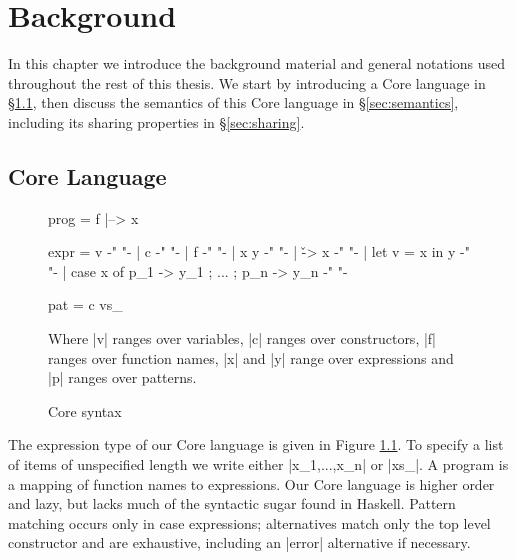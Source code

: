 

\chapter{Background}
\label{chp:background}

In this chapter we introduce the background material and general notations used throughout the rest of this thesis. We start by introducing a Core language in \S\ref{sec:core}, then discuss the semantics of this Core language in \S\ref{sec:semantics}, including its sharing properties in \S\ref{sec:sharing}.

\section{Core Language}
\label{sec:core}

\begin{figure}
\begin{code}
prog  =  f |--> x

expr  =  v                                          {-"  "-}
      |  c                                          {-"  "-}
      |  f                                          {-"  "-}
      |  x y                                        {-"  "-}
      |  \v -> x                                    {-"  "-}
      |  let v = x in y                             {-"  "-}
      |  case x of {p_1 -> y_1 ; ... ; p_n -> y_n}  {-"  "-}

pat   =  c vs_
\end{code}

Where |v| ranges over variables, |c| ranges over constructors, |f| ranges over function names, |x| and |y| range over expressions and |p| ranges over patterns.
\caption{Core syntax}
\label{fig:core}
\end{figure}

The expression type of our Core language is given in Figure \ref{fig:core}. To specify a list of items of unspecified length we write either |x_1,...,x_n| or |xs_|. A program is a mapping of function names to expressions. Our Core language is higher order and lazy, but lacks much of the syntactic sugar found in Haskell. Pattern matching occurs only in case expressions; alternatives match only the top level constructor and are exhaustive, including an |error| alternative if necessary.

